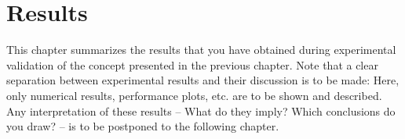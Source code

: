 \chapter{Results}
\label{chap:results}

This chapter summarizes the results that you have obtained during experimental validation of the concept presented in the previous chapter.
Note that a clear separation between experimental results and their discussion is to be made: Here, only numerical results, performance plots, etc. are to be shown and described.
Any interpretation of these results -- What do they imply? Which conclusions do you draw? -- is to be postponed to the following chapter.

